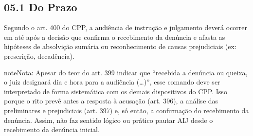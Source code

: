 \documentclass[letterpaper,10pt,brazil]{sphinxmanual}
\begin{document}
\subsection{05.1 \textendash{} Do Prazo}
\label{\detokenize{05pautaraij:do-prazo}}
\sphinxAtStartPar
Segundo o art. 400 do CPP, a audiência de instrução e julgamento deverá ocorrer em até  após a decisão que confirma o recebimento da denúncia e afasta as hipóteses de absolvição sumária ou reconhecimento de causas prejudiciais (ex: prescrição, decadência).

\begin{sphinxadmonition}{note}{Nota:}
\sphinxAtStartPar
Apesar do teor do art. 399 indicar que “recebida a denúncia ou queixa, o juiz designará dia e hora para a audiência (…)”, esse comando deve ser interpretado de forma sistemática com os demais dispositivos do CPP.
Isso porque o rito prevê antes a resposta à acusação (art. 396), a análise das preliminares e prejudiciais (art. 397) e, só então, a confirmação do recebimento da denúncia.
Assim, não faz sentido lógico ou prático pautar AIJ desde o recebimento da denúncia inicial.
\end{sphinxadmonition}
\end{document}
